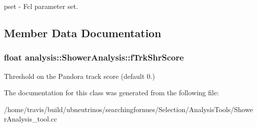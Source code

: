 pset -\/ Fcl parameter set. 

\subsection{Member Data Documentation}
\hypertarget{classanalysis_1_1ShowerAnalysis_a6c8d14b6e2fa51eeda76204dbd27ca3d}{
\subsubsection[{f\-Trk\-Shr\-Score}]{\setlength{\rightskip}{0pt plus 5cm}float analysis\-::\-Shower\-Analysis\-::f\-Trk\-Shr\-Score\hspace{0.3cm}{\ttfamily [private]}}}\label{classanalysis_1_1ShowerAnalysis_a6c8d14b6e2fa51eeda76204dbd27ca3d}
Threshold on the Pandora track score (default 0.) 

The documentation for this class was generated from the following file\-:\begin{DoxyCompactItemize}
\item 
/home/travis/build/ubneutrinos/searchingfornues/\-Selection/\-Analysis\-Tools/Shower\-Analysis\-\_\-tool.\-cc\end{DoxyCompactItemize}
